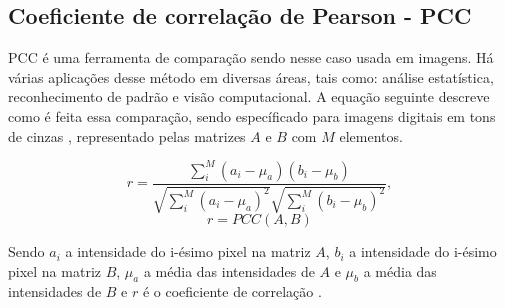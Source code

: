 \begin{comment}

\subsection{THE PEARSON CORRELATION COEFFICIENT}

$PCC$ is used in statistical analyses, pattern recognition and computer vision. 
It can be used to comparing two images in an object recognition system. 
The following equation describes the $PCC$ method for two gray scale digital images\cite{Eugene},
represented by the matrices $A$ and $B$ with $M$ elements each one,
\begin{equation}
r = \frac{\sum \limits_{i}^{M} (a_i-\mu_a)(b_i-\mu_b)}{\sqrt{\sum \limits_{i}^{M} (a_i-\mu_a)^2} \sqrt{\sum\limits_{i}^{M} (b_i-\mu_b)^2}},
\end{equation}
\begin{equation}\label{eq:PCC}
 r=PCC(A,B)
\end{equation}

where $a_i$ is the intensity of the i-th pixel in the  matrix $A$, 
$b_i$ is the intensity of the i-th pixel in the matrix $B$, 
$\mu_a$ is the mean intensity of $A$,
$\mu_b$ is the mean intensity of $B$ and
$r$ is the correlation coefficient \cite{Miranda Neto}.

\end{comment}



\subsection{Coeficiente de correlação de Pearson - PCC}

PCC é uma ferramenta de comparação sendo nesse caso usada em imagens. Há várias aplicações desse método 
em diversas áreas, tais como: análise estatística, reconhecimento de padrão e visão computacional. 
A equação seguinte descreve como é feita essa comparação, sendo específicado para imagens digitais 
em tons de cinzas \cite{Eugene}, representado pelas matrizes $A$ e $B$ com $M$ elementos.

\begin{equation}
r = \frac{\sum \limits_{i}^{M} (a_i-\mu_a)(b_i-\mu_b)}{\sqrt{\sum \limits_{i}^{M} (a_i-\mu_a)^2} \sqrt{\sum\limits_{i}^{M} (b_i-\mu_b)^2}},
\end{equation}
\begin{equation}\label{eq:PCC}
 r=PCC(A,B)
\end{equation}

Sendo $a_i$ a intensidade do i-ésimo pixel na matriz $A$, $b_i$ a intensidade do i-ésimo pixel na matriz
$B$, $\mu_a$ a média das intensidades de $A$ e $\mu_b$ a média das intensidades de $B$ e $r$ é o coeficiente
de correlação \cite{Miranda Neto}.

